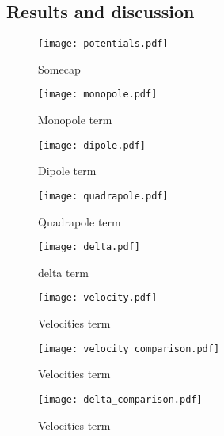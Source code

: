\subsection{Results and discussion}\label{sec:m3:results}


    \begin{figure}
        \texttt{[image: potentials.pdf]}
        \caption{Somecap}
        \label{fig:m3:potentials}
    \end{figure}

    \begin{figure}
        \texttt{[image: monopole.pdf]}
        \caption{Monopole term}
        \label{fig:m3:monopole}
    \end{figure}

    \begin{figure}
        \texttt{[image: dipole.pdf]}
        \caption{Dipole term}
        \label{fig:m3:dipole}
    \end{figure}

    \begin{figure}
        \texttt{[image: quadrapole.pdf]}
        \caption{Quadrapole term}
        \label{fig:m3:quadrapole}
    \end{figure}

    \begin{figure}
        \texttt{[image: delta.pdf]}
        \caption{delta term}
        \label{fig:m3:delta}
    \end{figure}

    \begin{figure}
        \texttt{[image: velocity.pdf]}
        \caption{Velocities term}
        \label{fig:m3:velocity}
    \end{figure}

    \begin{figure}
        \texttt{[image: velocity\_comparison.pdf]}
        \caption{Velocities term}
        \label{fig:m3:velocity_comparison}
    \end{figure}

    \begin{figure}
        \texttt{[image: delta\_comparison.pdf]}
        \caption{Velocities term}
        \label{fig:m3:delta_comparison}
    \end{figure}

